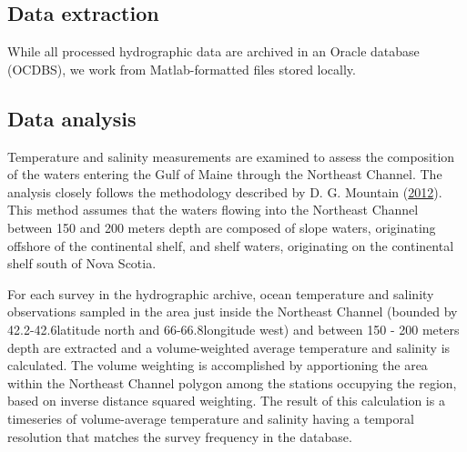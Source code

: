 \documentclass[
]{book}
\begin{document}
\hypertarget{data-extraction-30}{%
\subsection{Data extraction}\label{data-extraction-30}}

While all processed hydrographic data are archived in an Oracle database (OCDBS), we work from Matlab-formatted files stored locally.

\hypertarget{data-analysis-34}{%
\subsection{Data analysis}\label{data-analysis-34}}

Temperature and salinity measurements are examined to assess the composition of the waters entering the Gulf of Maine through the Northeast Channel. The analysis closely follows the methodology described by D. G. Mountain (\protect\hyperlink{ref-mountain2012}{2012}). This method assumes that the waters flowing into the Northeast Channel between 150 and 200 meters depth are composed of slope waters, originating offshore of the continental shelf, and shelf waters, originating on the continental shelf south of Nova Scotia.

For each survey in the hydrographic archive, ocean temperature and salinity observations sampled in the area just inside the Northeast Channel (bounded by 42.2-42.6\textdegree latitude north and 66-66.8\textdegree longitude west) and between 150 - 200 meters depth are extracted and a volume-weighted average temperature and salinity is calculated. The volume weighting is accomplished by apportioning the area within the Northeast Channel polygon among the stations occupying the region, based on inverse distance squared weighting. The result of this calculation is a timeseries of volume-average temperature and salinity having a temporal resolution that matches the survey frequency in the database.
\end{document}
